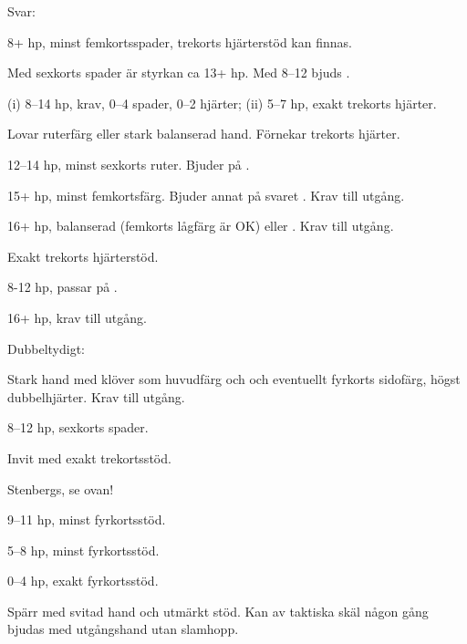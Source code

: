 Svar:
\begin{beskriv}
   \item[\NT{1}] 8+ hp, minst femkortsspader, trekorts hjärterstöd kan
     finnas.
     \begin{nummer}
     \item Med sexkorts spader är styrkan ca 13+ hp. Med 8--12 bjuds
       .
     \end{nummer}  
   \item[\spa{1}] (i) 8--14 hp, krav, 0--4 spader, 0--2 hjärter; (ii) 5--7
     hp, exakt trekorts hjärter. 
   \item[\kl{2}] Lovar ruterf\"arg eller stark balanserad hand. Förnekar
                 trekorts hjärter.
         \begin{nummer}
           \item 12--14 hp, minst sexkorts ruter. Bjuder  på .
           \item 15+ hp, minst femkortsf{\"a}rg. Bjuder annat p{\aa} svaret
                      . Krav till utgång.
	   \item 16+ hp, balanserad (femkorts lågfärg är OK) eller
                        . Krav till utgång.
          \end{nummer}
   \item[\ru{2}] Exakt trekorts hj\"arterst\"od.
          \begin{nummer}
            \item 8-12 hp, passar på .
            \item 16+ hp, krav till utgång.
           \end{nummer}
        \item[\hj{2}] Dubbeltydigt:
          \begin{nummer}
            \item Stark hand med kl\"over som
                 huvudf\"arg och och eventuellt fyrkorts sidofärg, högst
                 dubbelhjärter. Krav till utgång.
               \item 8--12 hp, sexkorts spader.
          \end{nummer}       
   \item[\spa{2}] Invit med exakt trekortsstöd.
   \item[\NT{2}] Stenbergs, se ovan!
   \item[\kl{3}] 9--11 hp, minst fyrkortsstöd.
   \item[\ru{3}] 5--8 hp, minst fyrkortsstöd.
   \item[\hj{3}] 0--4 hp, exakt fyrkortsstöd.
   \item[\hj{4}] Spärr med svitad hand och utmärkt stöd. Kan av taktiska
     skäl någon gång bjudas med utgångshand utan slamhopp.
\end{beskriv}

